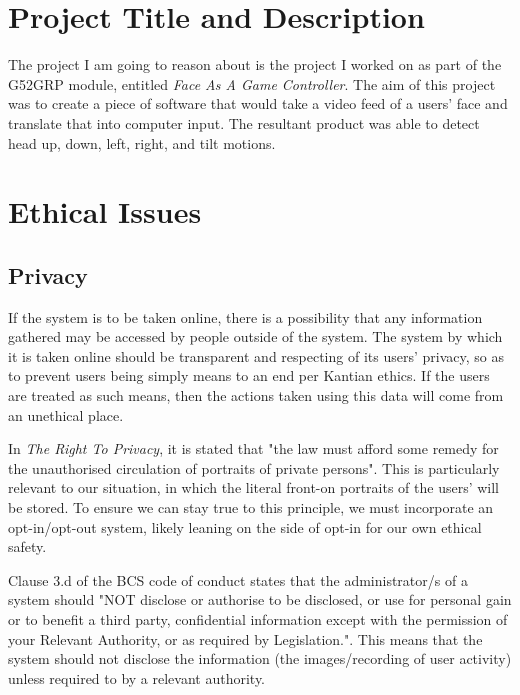 \documentclass[12pt]{article}
\begin{document}
\maketitle

\section{Project Title and Description}
The project I am going to reason about is the project I worked on as part of the G52GRP module, entitled \textit{Face As A Game Controller}. 
The aim of this project was to create a piece of software that would take a video feed of a users' face and translate that into computer input. 
The resultant product was able to detect head up, down, left, right, and tilt motions. 

\section{Ethical Issues}
\subsection{Privacy}
If the system is to be taken online, there is a possibility that any information gathered may be accessed by people outside of the system\cite{equifax}. 
The system by which it is taken online should be transparent and respecting of its users' privacy, so as to prevent users being simply means to an end per Kantian ethics. 
If the users are treated as such means, then the actions taken using this data will come from an unethical place. 

In \textit{The Right To Privacy}, it is stated that "the law must afford some remedy for the unauthorised circulation of portraits of private persons"\cite{righttoprivacy}. 
This is particularly relevant to our situation, in which the literal front-on portraits of the users' will be stored. 
To ensure we can stay true to this principle, we must incorporate an opt-in/opt-out system, likely leaning on the side of opt-in for our own ethical safety. 

Clause 3.d of the BCS code of conduct states that the administrator/s of a system should "NOT disclose or authorise to be disclosed, or use for personal gain or to benefit a third party, confidential information except with the permission of your Relevant Authority, or as required by Legislation."\cite{bcs}. 
This means that the system should not disclose the information (the images/recording of user activity) unless required to by a relevant authority. 
\end{document}
